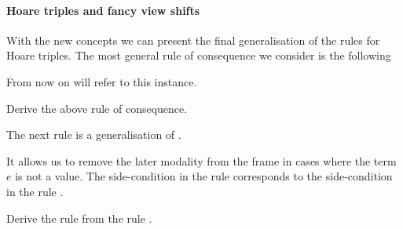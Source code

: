 \paragraph*{Hoare triples and fancy view shifts}

With the new concepts we can present the final generalisation of the rules for Hoare triples.
The most general rule of consequence we consider is the following
\begin{mathpar}
\end{mathpar}
From now on  will refer to this instance.
\begin{exercise}
  Derive the above rule of consequence.
\end{exercise}


The next rule is a generalisation of .
It allows us to remove the later modality from the frame in cases where the term $e$ is not a value.
The side-condition in the rule corresponds to the side-condition in the rule .
\begin{exercise}
  Derive the rule  from the rule .
\end{exercise}


